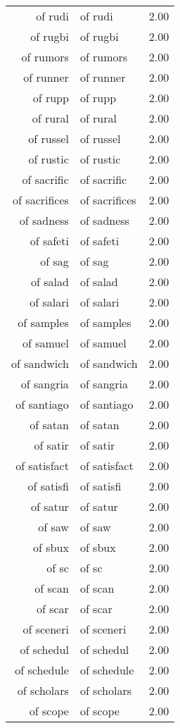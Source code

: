 \begin{table}[ht]
\begin{tabular}{rlr}
  of rudi & of rudi & 2.00 \\ 
  of rugbi & of rugbi & 2.00 \\ 
  of rumors & of rumors & 2.00 \\ 
  of runner & of runner & 2.00 \\ 
  of rupp & of rupp & 2.00 \\ 
  of rural & of rural & 2.00 \\ 
  of russel & of russel & 2.00 \\ 
  of rustic & of rustic & 2.00 \\ 
  of sacrific & of sacrific & 2.00 \\ 
  of sacrifices & of sacrifices & 2.00 \\ 
  of sadness & of sadness & 2.00 \\ 
  of safeti & of safeti & 2.00 \\ 
  of sag & of sag & 2.00 \\ 
  of salad & of salad & 2.00 \\ 
  of salari & of salari & 2.00 \\ 
  of samples & of samples & 2.00 \\ 
  of samuel & of samuel & 2.00 \\ 
  of sandwich & of sandwich & 2.00 \\ 
  of sangria & of sangria & 2.00 \\ 
  of santiago & of santiago & 2.00 \\ 
  of satan & of satan & 2.00 \\ 
  of satir & of satir & 2.00 \\ 
  of satisfact & of satisfact & 2.00 \\ 
  of satisfi & of satisfi & 2.00 \\ 
  of satur & of satur & 2.00 \\ 
  of saw & of saw & 2.00 \\ 
  of sbux & of sbux & 2.00 \\ 
  of sc & of sc & 2.00 \\ 
  of scan & of scan & 2.00 \\ 
  of scar & of scar & 2.00 \\ 
  of sceneri & of sceneri & 2.00 \\ 
  of schedul & of schedul & 2.00 \\ 
  of schedule & of schedule & 2.00 \\ 
  of scholars & of scholars & 2.00 \\ 
  of scope & of scope & 2.00 \\ 

\end{tabular}
\end{table}
